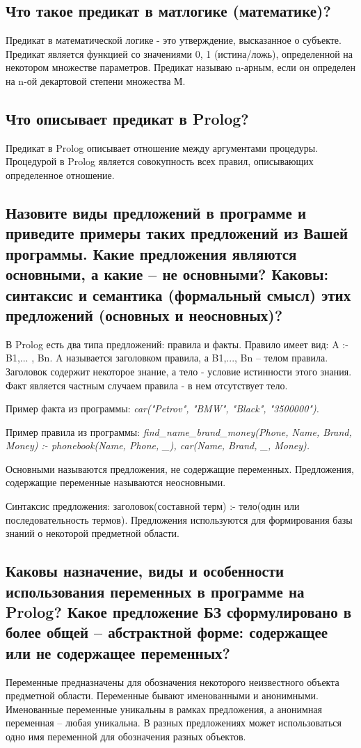 \documentclass[a4paper,12pt]{article}
\begin{document}
\subsection*{Что такое предикат в матлогике (математике)?}
Предикат в математической логике - это утверждение, высказанное о субъекте. Предикат является функцией со значениями {0, 1} (истина/ложь), определенной на некотором множестве параметров. Предикат называю n-арным, если он определен на n-ой декартовой степени множества М.
\subsection*{Что описывает предикат в Prolog?}
Предикат в Prolog описывает отношение между аргументами процедуры. Процедурой в Prolog является совокупность всех правил, описывающих определенное отношение.
\subsection*{Назовите виды предложений в программе и приведите примеры таких предложений из Вашей программы. Какие предложения являются основными, а какие – не основными?  Каковы: синтаксис и семантика (формальный смысл) этих предложений (основных и неосновных)?}
В Prolog есть два типа предложений: правила и факты. Правило имеет вид: A :- B1,... , Bn. 
A называется заголовком правила, а B1,..., Bn – телом правила. Заголовок содержит некоторое знание, а тело - условие истинности этого знания. Факт является частным случаем правила - в нем отсутствует тело.

Пример факта из программы: \emph{car("Petrov"{}, "BMW"{}, "Black"{}, "3500000"). }

Пример правила из программы: \emph{find\_name\_brand\_money(Phone, Name, Brand, Money) :- phonebook(Name, Phone, \_), car(Name, Brand, \_, Money). }

Основными называются предложения, не содержащие переменных. Предложения, содержащие переменные называются неосновными. 

Синтаксис предложения: заголовок(составной терм) :- тело(один или последовательность термов). Предложения используются для формирования базы знаний о некоторой предметной области.
\subsection*{Каковы назначение, виды и особенности использования переменных в программе на Prolog? Какое предложение БЗ сформулировано в более общей – абстрактной форме: содержащее или не содержащее переменных?}
Переменные предназначены для обозначения некоторого неизвестного объекта предметной области. Переменные бывают именованными и анонимными. Именованные переменные уникальны в рамках предложения, а анонимная переменная – любая уникальна. В разных предложениях может использоваться одно имя переменной для обозначения разных объектов.
\end{document}
